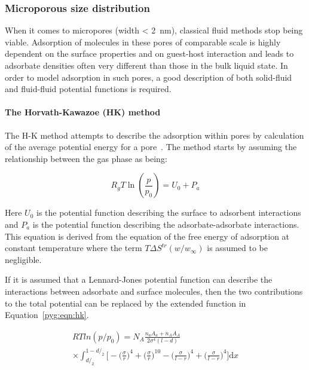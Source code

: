 \subsubsection{Microporous size distribution}

When it comes to micropores (width \SI{< 2}{\nano\metre}), classical
fluid methods stop being viable. Adsorption of molecules in these pores
of comparable scale is highly dependent on the surface properties and 
on guest-host interaction and leads to adsorbate densities often
very different than those in the bulk liquid state.
In order to model adsorption in such pores, a good description of 
both solid-fluid and fluid-fluid potential functions is required.

\paragraph{The Horvath-Kawazoe (HK) method}

The H-K method attempts to describe the adsorption within pores 
by calculation of the average potential energy for a 
pore~\cite{horvathMethodCalculationEffective1983}.
The method starts by assuming the
relationship between the gas phase as being:

\begin{equation}
	R_g T \ln(\frac{p}{p_0}) = U_0 + P_a
\end{equation}

Here \(U_0\) is the potential function describing the surface to adsorbent
interactions and \(P_a\) is the potential function describing the 
adsorbate-adsorbate interactions. This equation is derived from the 
equation of the free energy of adsorption at constant temperature where 
the term \(T \Delta S^{tr}(w/w_{\infty})\) is assumed to be negligible.

If it is assumed that a Lennard-Jones potential function can describe 
the interactions between adsorbate and surface molecules, then 
the two contributions to the total potential can be replaced by the
extended function in Equation~\ref{pyg:eqn:hk}.

\begin{multline}\label{pyg:eqn:hk}
	RTln(p/p_0) =   N_A\frac{n_a A_a + n_A A_A}{2 \sigma^{4}(l-d)} \\
	\times \int_{d/_2}^{1-d/_2}
	\Big[
		- \Big(\frac{\sigma}{r}\Big)^{4}
		+ \Big(\frac{\sigma}{r}\Big)^{10}
		- \Big(\frac{\sigma}{l-r}\Big)^{4}
		+ \Big(\frac{\sigma}{l-r}\Big)^{4}
		\Big] \mathrm{d}x
\end{multline}

